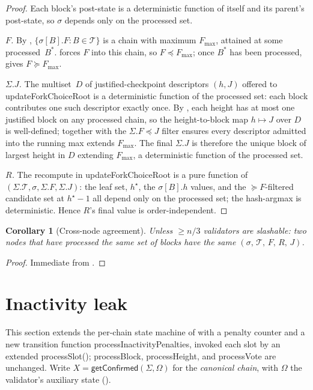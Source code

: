 \ifx\litemode\undefined\documentclass{article}\fi
\newcommand{\T}[0]{\ensuremath{\mathcal{T}}}
\newcommand{\processSlot}{\textsf{processSlot}\xspace}
\newcommand{\processBlock}{\textsf{processBlock}\xspace}
\newcommand{\processHeight}{\textsf{processHeight}\xspace}
\newcommand{\processVote}{\textsf{processVote}\xspace}
\newcommand{\processInactivityPenalties}{\textsf{processInactivityPenalties}\xspace}
\newcommand{\updateForkChoiceRoot}{\textsf{updateForkChoiceRoot}\xspace}
\newcommand{\getConfirmed}{\textsf{getConfirmed}\xspace}
\theoremstyle{plain}
\newtheorem{corollary}{Corollary}
\theoremstyle{definition}
\theoremstyle{remark}
\begin{document}
\begin{proof}
Each block's post-state is a deterministic function of itself and its parent's post-state, so $\sigma$ depends only on the processed set.

\emph{$F$.} By , $\{\sigma[B].F : B \in \T\}$ is a chain with maximum $F_{\max}$, attained at some processed~$B^\ast$.
 forces $F$ into this chain, so $F \preceq F_{\max}$; once $B^\ast$ has been processed,  gives $F \succeq F_{\max}$.

\emph{$\Sigma.J$.} The multiset~$D$ of justified-checkpoint descriptors $(h, J)$ offered to \updateForkChoiceRoot is a deterministic function of the processed set: each block contributes one such descriptor exactly once.
By , each height has at most one justified block on any processed chain, so the height-to-block map $h \mapsto J$ over $D$ is well-defined;  together with the $\Sigma.F \preceq J$ filter ensures every descriptor admitted into the running max extends $F_{\max}$.
The final $\Sigma.J$ is therefore the unique block of largest height in $D$ extending $F_{\max}$, a deterministic function of the processed set.

\emph{$R$.} The recompute in \updateForkChoiceRoot is a pure function of $(\Sigma.\T, \sigma, \Sigma.F, \Sigma.J)$: the leaf set, $h^\star$, the $\sigma[B].h$ values, and the $\succeq F$-filtered candidate set at $h^\star - 1$ all depend only on the processed set; the hash-argmax is deterministic. Hence $R$'s final value is order-independent.
\end{proof}

\begin{corollary}[Cross-node agreement]\label{cor:agreement}
Unless $\geq n/3$ validators are slashable: two nodes that have processed the same set of blocks have the same $(\sigma,\, \T,\, F,\, R,\, J)$.
\end{corollary}

\begin{proof}
Immediate from .
\end{proof}

\section{Inactivity leak}

This section extends the per-chain state machine of  with a penalty counter and a new transition function \processInactivityPenalties, invoked each slot by an extended \processSlot (); \processBlock, \processHeight, and \processVote are unchanged.
Write $X = \getConfirmed(\Sigma, \Omega)$ for the \emph{canonical chain}, with $\Omega$ the validator's auxiliary state ().
\end{document}
